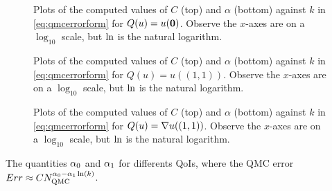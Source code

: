 \begin{figure}[h]
    \centering
    \begin{subfigure}{\textwidth}
            \centering

  \end{subfigure}
    \begin{subfigure}{\textwidth}
                \centering

    \end{subfigure}

\caption{Plots of the computed values of $C$ (top) and $\alpha$ (bottom) against $k$ in \cref{eq:qmcerrorform} for $Q(u) =  u(\mathbf{0})$. Observe the $x$-axes are on a $\log_{10}$ scale, but $\operatorname{ln}$ is the natural logarithm. \label{fig:originCalpha}}
\end{figure}

\begin{figure}[h]
    \centering
    \begin{subfigure}{\textwidth}
            \centering

  \end{subfigure}
    \begin{subfigure}{\textwidth}
            \centering

    \end{subfigure}
\caption{Plots of the computed values of $C$ (top) and $\alpha$ (bottom) against $k$ in \cref{eq:qmcerrorform} for $Q(u) = u((1,1))$. Observe the $x$-axes are on a $\log_{10}$ scale, but $\operatorname{ln}$ is the natural logarithm.  \label{fig:toprightCalpha}}
\end{figure}

\begin{figure}[h]
    \centering
    \begin{subfigure}{\textwidth}
            \centering

  \end{subfigure}
    \begin{subfigure}{\textwidth}
            \centering 

    \end{subfigure}
\caption{Plots of the computed values of $C$ (top) and $\alpha$ (bottom) against $k$ in \cref{eq:qmcerrorform} for $Q(u) = \nabla u((1,1))$. Observe the $x$-axes are on a $\log_{10}$ scale, but $\operatorname{ln}$ is the natural logarithm.  \label{fig:gradienttoprightCalpha}}
\end{figure}


\begin{table}[h!]
  \centering
  
  \caption{The quantities $\alpha_{0}$ and $\alpha_{1}$ for differents QoIs, where the QMC error $Err \approx C N_{\mathrm{QMC}}^{\alpha_{0} - \alpha_{1}\operatorname{ln}(k)}$.}\label{tab:qmcalpha}
  \end{table}

